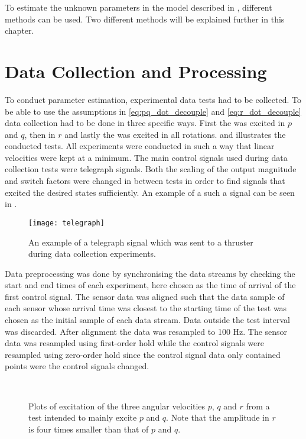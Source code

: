 To estimate the unknown parameters in the \abbrROV model described in , different methods can be used. Two different methods will be explained further in this chapter.  
\section{Data Collection and Processing} 
To conduct parameter estimation, experimental data tests had to be collected. To be able to use the assumptions in \eqref{eq:pq_dot_decouple} and \eqref{eq:r_dot_decouple} data collection had to be done in three specific ways.
First the \abbrROV was excited in $p$ and $q$, then in $r$ and lastly the \abbrROV was excited in all rotations.  and  illustrates the conducted tests. All experiments were conducted in such a way that linear velocities were kept at a minimum.
The main control signals used during data collection tests were telegraph signals. Both the scaling of the output magnitude and switch factors were changed in between tests in order to find signals that excited the desired states sufficiently. An example of a such a signal can be seen in .

\begin{figure}[htbp]
\centering
\texttt{[image: telegraph]}
\caption{An example of a telegraph signal which was sent to a thruster during data collection experiments.}
\label{fig:telegraph}
\end{figure}

Data preprocessing was done by synchronising the data streams by checking the start and end times of each experiment, here chosen as the time of arrival of the first control signal. The sensor data was aligned such that the data sample of each sensor whose arrival time was closest to the starting time of the test was chosen as the initial sample of each data stream. Data outside the test interval was discarded. After alignment the data was resampled to 100 Hz. The sensor data was resampled using first-order hold while the control signals were resampled using zero-order hold since the control signal data only contained points were the control signals changed.  

\begin{figure}[htbp]
  \centering
  \qquad
  \\
  \caption{\label{fig:pqTest}%
 Plots of excitation of the three angular velocities $p$, $q$ and $r$ from a test intended to mainly excite $p$ and $q$. Note that the amplitude in $r$ is four times smaller than that of $p$ and $q$.}
\end{figure}

